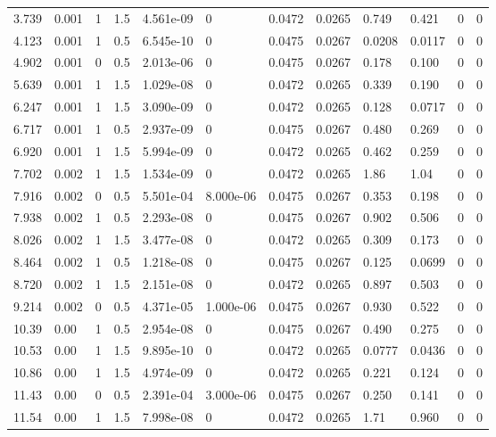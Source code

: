 \documentclass[preview]{standalone}
\begin{document}
{{\begin{tabular}{L{1.2cm}C{1.2cm} C{0.3cm}C{0.5cm} C{1.4cm}C{1.4cm} C{1.4cm}C{1.4cm} C{1.6cm}C{1.6cm} C{1.6cm}C{1.6cm}}
  3.739  &  0.001  & 1     & 1.5 &  4.561e-09  & 0  &  0.0472&   0.0265& 0.749 & 0.421   &  0 & 0  \\ 
  4.123  &  0.001  & 1     & 0.5 &  6.545e-10  & 0  &  0.0475&   0.0267& 0.0208 & 0.0117   &  0 & 0  \\ 
  4.902  &  0.001  & 0     & 0.5 &  2.013e-06  & 0  &  0.0475&   0.0267& 0.178 & 0.100   &  0 & 0  \\ 
  5.639  &  0.001  & 1     & 1.5 &  1.029e-08  & 0  &  0.0472&   0.0265& 0.339 & 0.190   &  0 & 0  \\ 
  6.247  &  0.001  & 1     & 1.5 &  3.090e-09  & 0  &  0.0472&   0.0265& 0.128 & 0.0717   &  0 & 0  \\ 
  6.717  &  0.001  & 1     & 0.5 &  2.937e-09  & 0  &  0.0475&   0.0267& 0.480 & 0.269   &  0 & 0  \\ 
  6.920  &  0.001  & 1     & 1.5 &  5.994e-09  & 0  &  0.0472&   0.0265& 0.462 & 0.259   &  0 & 0  \\ 
  7.702  &  0.002  & 1     & 1.5 &  1.534e-09  & 0  &  0.0472&   0.0265& 1.86 & 1.04   &  0 & 0  \\ 
  7.916  &  0.002  & 0     & 0.5 &  5.501e-04  & 8.000e-06  &  0.0475&   0.0267& 0.353 & 0.198   &  0 & 0  \\ 
  7.938  &  0.002  & 1     & 0.5 &  2.293e-08  & 0  &  0.0475&   0.0267& 0.902 & 0.506   &  0 & 0  \\ 
  8.026  &  0.002  & 1     & 1.5 &  3.477e-08  & 0  &  0.0472&   0.0265& 0.309 & 0.173   &  0 & 0  \\ 
  8.464  &  0.002  & 1     & 0.5 &  1.218e-08  & 0  &  0.0475&   0.0267& 0.125 & 0.0699   &  0 & 0  \\ 
  8.720  &  0.002  & 1     & 1.5 &  2.151e-08  & 0  &  0.0472&   0.0265& 0.897 & 0.503   &  0 & 0  \\ 
  9.214  &  0.002  & 0     & 0.5 &  4.371e-05  & 1.000e-06  &  0.0475&   0.0267& 0.930 & 0.522   &  0 & 0  \\ 
  10.39  &  0.00  & 1     & 0.5 &  2.954e-08  & 0  &  0.0475&   0.0267& 0.490 & 0.275   &  0 & 0  \\ 
  10.53  &  0.00  & 1     & 1.5 &  9.895e-10  & 0  &  0.0472&   0.0265& 0.0777 & 0.0436   &  0 & 0  \\ 
  10.86  &  0.00  & 1     & 1.5 &  4.974e-09  & 0  &  0.0472&   0.0265& 0.221 & 0.124   &  0 & 0  \\ 
  11.43  &  0.00  & 0     & 0.5 &  2.391e-04  & 3.000e-06  &  0.0475&   0.0267& 0.250 & 0.141   &  0 & 0  \\ 
  11.54  &  0.00  & 1     & 1.5 &  7.998e-08  & 0  &  0.0472&   0.0265& 1.71 & 0.960   &  0 & 0  \\ 

\end{tabular}}}
\end{document}
